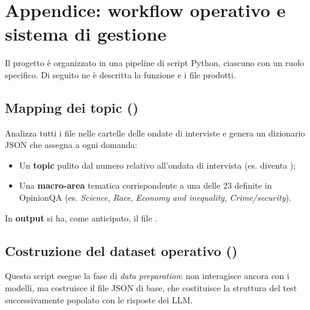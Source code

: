 \documentclass[../relazione.tex]{subfiles}
\begin{document}
\section{Appendice: workflow operativo e sistema di gestione}

Il progetto è organizzato in una pipeline di script Python, ciascuno con un ruolo specifico. Di seguito ne è descritta la funzione e i file prodotti.

\subsection{Mapping dei topic (\protect{})}
Analizza tutti i file  nelle cartelle delle ondate di interviste e genera un dizionario JSON che assegna a ogni domanda:
\begin{itemize}
    \item Un \textbf{topic} pulito dal numero relativo all'ondata di intervista (es.  diventa );
    \item Una \textbf{macro-area} tematica corrispondente a una delle 23 definite in OpinionQA (es. \emph{Science}, \emph{Race}, \emph{Economy and inequality}, \emph{Crime/security}).
\end{itemize}
In \textbf{output} si ha, come anticipato, il file .

\subsection{Costruzione del dataset operativo (\protect{})}
Questo script esegue la fase di \textit{data preparation}: non interagisce ancora con i modelli, ma costruisce il file JSON di base, che costituisce la struttura del test successivamente popolato con le risposte dei LLM. 
\end{document}
